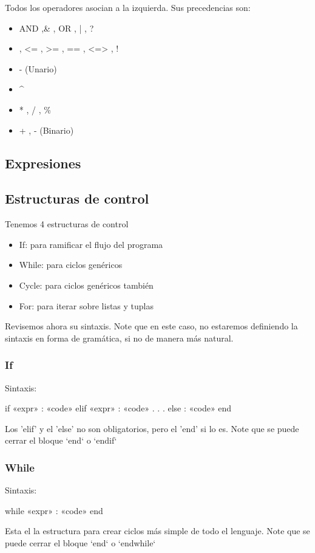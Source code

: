 \documentclass[12pt, spanish]{report}
\begin{document}
Todos los operadores asocian a la izquierda. Sus precedencias son:
\begin{itemize}
\item AND ,\& , OR , | , ?
\item < , > , <= , >= , == , <=> , !
\item - (Unario)
\item ^
\item * , / , \%
\item + , - (Binario)
\end{itemize}


\subsection{Expresiones}
\label{sec:expr}

\subsection{Estructuras de control}
\label{sec:ecntrl}
Tenemos 4 estructuras de control
\begin{itemize}
\item If: para ramificar el flujo del programa
\item While: para ciclos gen\'ericos
\item Cycle: para ciclos gen\'ericos tambi\'en
\item For: para iterar sobre listas y tuplas
\end{itemize}

Revisemos ahora su sintaxis. Note que en este caso, no estaremos
definiendo la sintaxis en forma de gramática, si no de manera más natural.

\subsubsection{If}
Sintaxis:

   if «expr» :
       «code»
   elif «expr» :
       «code»
   .
   .
   .
   else :
       «code»
   end

Los 'elif' y el 'else' no son obligatorios, pero el 'end' si lo es.%
Note que se puede cerrar el bloque `end` o `endif`

\subsubsection{While}
Sintaxis:

   while «expr» :
       «code»
   end

Esta el la estructura para crear ciclos más simple de todo el lenguaje.%
Note que se puede cerrar el bloque `end` o `endwhile`
\end{document}
